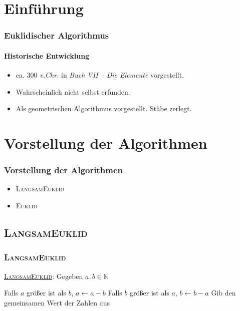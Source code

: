 \documentclass[•]{beamer}
\begin{document}
\section{Einf\"uhrung}

\begin{frame}       
	\frametitle{Euklidischer Algorithmus}
    \framesubtitle{Historische Entwicklung}
    \begin{itemize}
    \pause 
    \item  ca. 300 \textit{v.Chr.} in \textit{Buch VII -- Die Elemente} vorgestellt.
    \pause 
    \item Wahrscheinlich nicht selbst erfunden.
    \pause 
    \item Als geometrischen Algorithmus vorgestellt. St\"abe zerlegt.
    \end{itemize}
\end{frame}

\section{Vorstellung der Algorithmen}
\begin{frame}
	\frametitle{Vorstellung der Algorithmen}
	\begin{itemize}
	\item \textsc{LangsamEuklid}
	\item \textsc{Euklid}
	\end{itemize}
\end{frame}


\subsection{\textsc{LangsamEuklid}}
\begin{frame}
	\frametitle{\textsc{LangsamEuklid}}
	\underline{\textsc{LangsamEuklid}}: Gegeben $a,b\in\mathbb{N}$
	\pause
	\begin{algorithmic}[1]
	\pause
	\State Falls $a$ gr\"o{\ss}er ist als $b$, $a\gets a-b$
	\State Falls $b$ gr\"o{\ss}er ist als $a$, $b\gets b-a$
	\pause
\EndWhile
	\pause
	\State Gib den gemeinsamen Wert der Zahlen aus
\end{algorithmic}
\end{frame}
\end{document}
